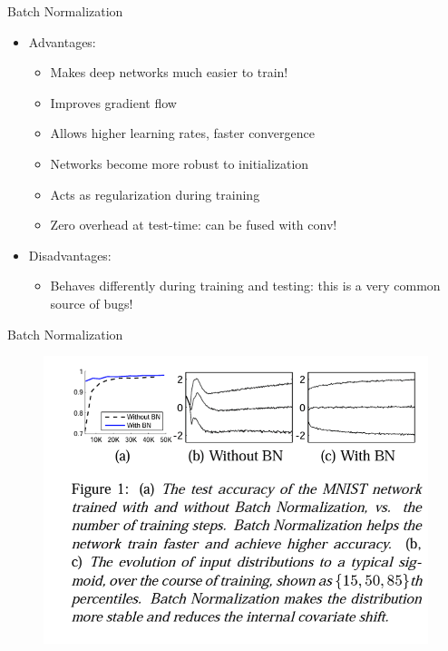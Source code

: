 \documentclass[10pt]{beamer}
\theoremstyle{remark}
\theoremstyle{definition}
\begin{document}
\begin{frame}{Batch Normalization}
\begin{itemize}
    \item Advantages:
    \begin{itemize}
        \item Makes deep networks much easier to train!
        \item Improves gradient flow
        \item Allows higher learning rates, faster convergence
        \item Networks become more robust to initialization
        \item Acts as regularization during training
        \item Zero overhead at test-time: can be fused with conv!
    \end{itemize}
    \pause
    \item Disadvantages:
    \begin{itemize}
        \item Behaves differently during training and testing: this is a very common source of bugs!
    \end{itemize}
\end{itemize}
\end{frame}

\begin{frame}{Batch Normalization}
\begin{figure}
\centering
\includegraphics[width=1.0\textwidth,height=0.9\textheight,keepaspectratio]{./images/batch_norm_6.png}
\end{figure}
\end{frame}
\end{document}
